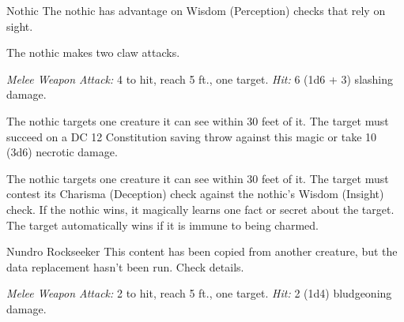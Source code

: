 \documentclass[10pt,a4paper,twoside,bg=print,twocolumn,openany,nodeprecatedcode]{dndbook}
\begin{document}
\begin{DndMonster}[float=t]{Nothic}
\DndMonsterBasics[
armor-class = {15 (natural armor)},
hit-points = {\DndDice{6d8 + 18}},
speed = {30 ft.}
]
\DndMonsterAbilityScores[
 str = 14,
 dex = 16,
 con = 16,
 int = 13,
 wis = 10,
 cha = 8
]
\DndMonsterDetails[
skills = {Arcana +3, Insight +4, Perception +2, Stealth +5},
senses = {truesight 120 ft., passive perception 12},
languages = {Undercommon},
challenge = 2,
]
The nothic has advantage on Wisdom (Perception) checks that rely on sight.

The nothic makes two claw attacks.

\textsl{Melee Weapon Attack:} 4 to hit, reach 5 ft., one target. \textsl{Hit:} 6 (1d6 + 3) slashing damage.

The nothic targets one creature it can see within 30 feet of it. The target must succeed on a DC 12 Constitution saving throw against this magic or take 10 (3d6) necrotic damage.

The nothic targets one creature it can see within 30 feet of it. The target must contest its Charisma (Deception) check against the nothic's Wisdom (Insight) check. If the nothic wins, it magically learns one fact or secret about the target. The target automatically wins if it is immune to being charmed.

\end{DndMonster}



\begin{DndMonster}[float=t]{Nundro Rockseeker}
\DndMonsterBasics[
armor-class = {10},
hit-points = {\DndDice{1d8}},
speed = {30 ft.}
]
\DndMonsterAbilityScores[
 str = 10,
 dex = 10,
 con = 10,
 int = 10,
 wis = 10,
 cha = 10
]
\DndMonsterDetails[
languages = {any one language (usually Common)},
challenge = 0,
]
This content has been copied from another creature, but the data replacement hasn't been run. Check details.

\textsl{Melee Weapon Attack:} 2 to hit, reach 5 ft., one target. \textsl{Hit:} 2 (1d4) bludgeoning damage.

\end{DndMonster}
\end{document}
